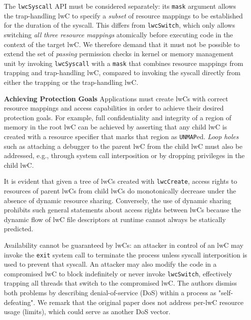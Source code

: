 \documentclass[10pt,twocolumn,letter]{article}
\begin{document}
The \lstinline{lwcSyscall} API must be considered separately:
its \lstinline{mask} argument allows the trap-handling lwC to specify a \textit{subset} of resource mappings to be established for the duration of the syscall.
This differs from \lstinline{lwcSwitch}, which only allows switching \textit{all three resource mappings} atomically before executing code in the context of the target lwC.
We therefore demand that it must not be possible to extend the set of \textit{passing} permission checks in kernel or memory management unit by invoking \lstinline{lwcSyscall} with a \lstinline{mask} that combines resource mappings from trapping and trap-handling lwC, compared to invoking the syscall directly from either the trapping or the trap-handling lwC.


\textbf{Achieving Protection Goals}\hspace{1em}
Applications must create lwCs with correct resource mappings and access capabilities in order to achieve their desired protection goals.
For example, full confidentiality and integrity of a region of memory in the root lwC can be achieved by asserting that any child lwC is created with a resource specifier that marks that region as \lstinline{UNMAP}ed.
\textit{Loop holes} such as attaching a debugger to the parent lwC from the child lwC must also be addressed, e.g., through system call interposition or by dropping privileges in the child lwC.

It is evident that given a tree of lwCs created with \lstinline{lwcCreate}, access rights to resources of parent lwCs from child lwCs do monotonically decrease under the absence of dynamic resource sharing.
Conversely, the use of dynamic sharing prohibits such general statements about access rights between lwCs because the dynamic flow of lwC file descriptors at runtime cannot always be statically predicted.

Availability cannot be guaranteed by lwCs:
an attacker in control of an lwC may invoke the \lstinline{exit} system call to terminate the process unless syscall interposition is used to prevent that syscall.
An attacker may also modify the code in a compromised lwC to block indefinitely or never invoke \lstinline{lwcSwitch}, effectively trapping all threads that switch to the compromised lwC.
The authors dismiss both problems by describing denial-of-service (DoS) within a process as "self-defeating".
We remark that the original paper does not address per-lwC resource usage (limits), which could serve as another DoS vector. 
\end{document}
